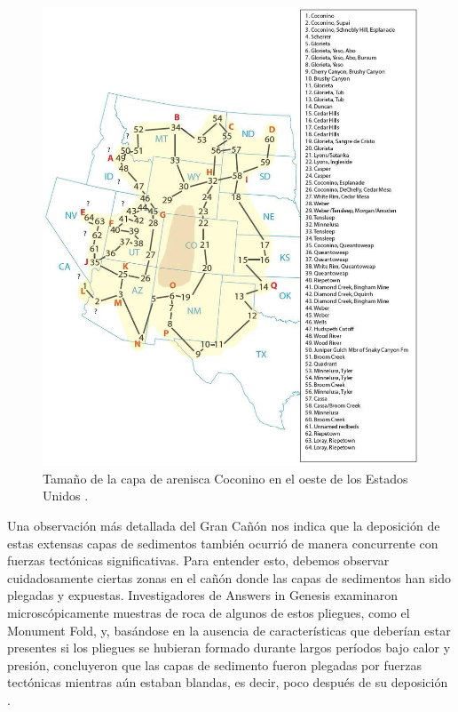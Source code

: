 \documentclass[10pt,twocolumn,letterpaper]{article}
\begin{document}
\begin{figure}[t]
\begin{center}
   \includegraphics[width=1\linewidth]{coconino.jpg}
\end{center}
   \caption{Tamaño de la capa de arenisca Coconino en el oeste de los Estados Unidos \cite{21}.}
\label{fig:3}
\label{fig:onecol}
\end{figure}

Una observación más detallada del Gran Cañón nos indica que la deposición de estas extensas capas de sedimentos también ocurrió de manera concurrente con fuerzas tectónicas significativas. Para entender esto, debemos observar cuidadosamente ciertas zonas en el cañón donde las capas de sedimentos han sido plegadas y expuestas. Investigadores de Answers in Genesis \cite{42} examinaron microscópicamente muestras de roca de algunos de estos pliegues, como el Monument Fold, y, basándose en la ausencia de características que deberían estar presentes si los pliegues se hubieran formado durante largos períodos bajo calor y presión, concluyeron que las capas de sedimento fueron plegadas por fuerzas tectónicas mientras aún estaban blandas, es decir, poco después de su deposición \cite{43}.
\end{document}
